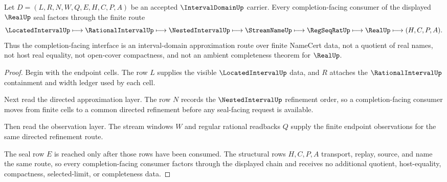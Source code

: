 \begin{theorem}
\label{thm:interval-domain-completion-approximation-scope}
Let $D=(L,R,N,W,Q,E,H,C,P,A)$ be an accepted $\IntervalDomainUp$ carrier. Every completion-facing consumer of the displayed $\RealUp$ seal factors through the finite route
$$
\LocatedIntervalUp\longmapsto\RationalIntervalUp\longmapsto\NestedIntervalUp\longmapsto\StreamNameUp\longmapsto\RegSeqRatUp\longmapsto\RealUp\longmapsto(H,C,P,A).
$$
Thus the completion-facing interface is an interval-domain approximation route over finite NameCert data, not a quotient of real names, not host real equality, not open-cover compactness, and not an ambient completeness theorem for $\RealUp$.
\end{theorem}
\begin{proof}
Begin with the endpoint cells. The row $L$ supplies the visible $\LocatedIntervalUp$ data, and $R$ attaches the $\RationalIntervalUp$ containment and width ledger used by each cell.

Next read the directed approximation layer. The row $N$ records the $\NestedIntervalUp$ refinement order, so a completion-facing consumer moves from finite cells to a common directed refinement before any seal-facing request is available.

Then read the observation layer. The stream windows $W$ and regular rational readbacks $Q$ supply the finite endpoint observations for the same directed refinement route.

The seal row $E$ is reached only after those rows have been consumed. The structural rows $H,C,P,A$ transport, replay, source, and name the same route, so every completion-facing consumer factors through the displayed chain and receives no additional quotient, host-equality, compactness, selected-limit, or completeness data.
\end{proof}

